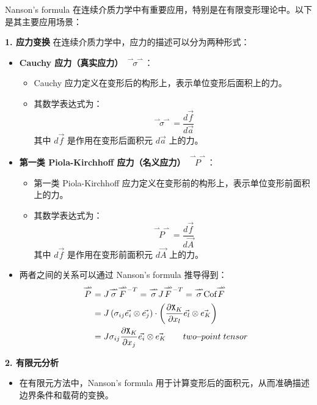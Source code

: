 \documentclass[12pt, a4paper, oneside, UTF8]{ctexbook}  %
\newcommand{\pa}{\partial}
\newcommand{\vvec}{\overset{\rightharpoonup\!\!\!\! \rightharpoonup}}
\newcommand{\X}{\mathtt{X}}
\newcommand{\mathminus}{\!\!-\!\!} %
\newcommand{\lsup}[1]{\raisebox{-0.85ex}{$\scriptstyle #1$}}
\begin{document}
\begin{add}
	Nanson's formula 在连续介质力学中有重要应用，特别是在有限变形理论中。以下是其主要应用场景：
	
	\textbf{1. 应力变换}
	在连续介质力学中，应力的描述可以分为两种形式：
	\begin{itemize}
		\item \textbf{Cauchy 应力（真实应力）} \(\vvec{\sigma}\)：
			\begin{itemize}
				\item Cauchy 应力定义在变形后的构形上，表示单位变形后面积上的力。
				\item 其数学表达式为：
					\[
					\vvec{\sigma} = \frac{d\vec{f}}{d\vec{a}}
					\]
					其中 \(d\vec{f}\) 是作用在变形后面积元 \(d\vec{a}\) 上的力。
			\end{itemize}
		\item \textbf{第一类 Piola-Kirchhoff 应力（名义应力）} \(\vvec{P}\)：
			\begin{itemize}
				\item 第一类 Piola-Kirchhoff 应力定义在变形前的构形上，表示单位变形前面积上的力。
				\item 其数学表达式为：
					\[
					\vvec{P} = \frac{d\vec{f}}{d\vec{A}}
					\]
					其中 \(d\vec{f}\) 是作用在变形前面积元 \(d\vec{A}\) 上的力。
			\end{itemize}
		\item 两者之间的关系可以通过 Nanson's formula 推导得到：
			\begin{align*}
				\vvec{P} &= J \vvec{\sigma} \vvec{F}^{\lsup{-T}}=\vvec{\sigma} J\vvec{F}^{\lsup{-T}}
				=\vvec{\sigma}\text{Cof}\vvec{F}\\
				&=J\left(\sigma_{ij}\vec{e_i}\otimes\vec{e_j}\right)\cdot
				\left(\frac{\pa \X_K}{\pa x_l}\vec{e_l}\otimes\vec{e_K}\right)\\
				&=J\sigma_{ij}\frac{\pa \X_K}{\pa x_j}\vec{e_i}\otimes\vec{e_K}\quad\quad two\mathminus point\; tensor
			\end{align*}
						
	\end{itemize}
	
	\textbf{2. 有限元分析}
	\begin{itemize}
		\item 在有限元方法中，Nanson's formula 用于计算变形后的面积元，从而准确描述边界条件和载荷的变换。
	\end{itemize}
\end{add}
\end{document}
